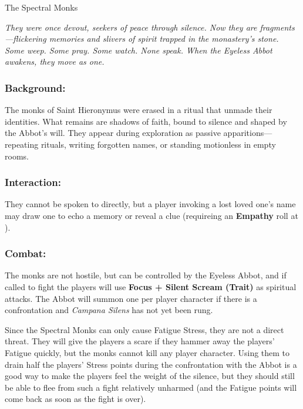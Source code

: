 \documentclass[nodeprecatedcode,bg=print]{dndbook/dndbook}
\begin{document}
\begin{WyrdFullNPC}[%
	name=The Spectral Monks,%
	description=Lingering echoes bound in silence,%
	float=!t%
]{The Spectral Monks}

    \emph{They were once devout, seekers of peace through silence. Now they are fragments—flickering memories and slivers of spirit trapped in the monastery's stone. Some weep. Some pray. Some watch. None speak. When the Eyeless Abbot awakens, they move as one.}

    \subsubsection*{Background:}
    The monks of Saint Hieronymus were erased in a ritual that unmade their identities. What remains are shadows of faith, bound to silence and shaped by the Abbot’s will. They appear during exploration as passive apparitions—repeating rituals, writing forgotten names, or standing motionless in empty rooms. 
    
    \subsubsection*{Interaction:}
    They cannot be spoken to directly, but a player invoking a lost loved one’s name may draw one to echo a memory or reveal a clue (requireing an \textbf{Empathy} roll at \Difficult).
    
    \subsubsection*{Combat:}
    The monks are not hostile, but can be controlled by the Eyeless Abbot, and if called to fight the players will use \textbf{Focus + Silent Scream (Trait)} as spiritual attacks. The Abbot will summon one per player character if there is a confrontation and \emph{Campana Silens} has not yet been rung.

    Since the Spectral Monks can only cause Fatigue Stress, they are not a direct threat. They will give the players a scare if they hammer away the players' Fatigue quickly, but the monks cannot kill any player character. Using them to drain half the players' Stress points during the confrontation with the Abbot is a good way to make the players feel the weight of the silence, but they should still be able to flee from such a fight relatively unharmed (and the Fatigue points will come back as soon as the fight is over).


\end{WyrdFullNPC}
\end{document}
